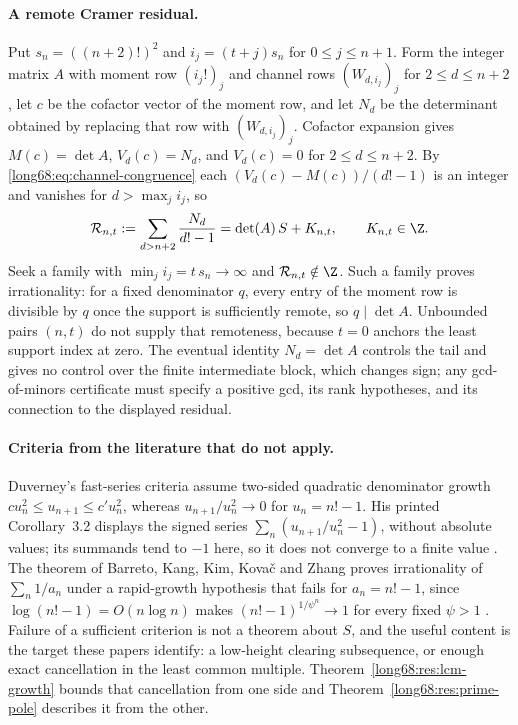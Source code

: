 \documentclass[11pt]{article}
\newcommand{\Ser}{S}
\newcommand{\chn}[2]{V_{#1}(#2)}
\begin{document}
\paragraph{A remote Cramer residual.}
Put $s_n=((n+2)!)^2$ and $i_j=(t+j)s_n$ for $0\le j\le n+1$.  Form the
integer matrix $A$ with moment row $(i_j!)_j$ and channel rows
$(W_{d,i_j})_j$ for $2\le d\le n+2$, let $c$ be the cofactor vector of the
moment row, and let $N_d$ be the determinant obtained by replacing that row
with $(W_{d,i_j})_j$.  Cofactor expansion gives $M(c)=\det A$,
$\chn dc=N_d$, and $\chn dc=0$ for $2\le d\le n+2$.  By
\eqref{long68:eq:channel-congruence} each $(\chn dc-M(c))/(d!-1)$ is an integer and
vanishes for $d>\max_ji_j$, so
\[
 \mathcal R_{n,t}:=\sum_{d>n+2}\frac{N_d}{d!-1}
 =\det(A)\,\Ser+K_{n,t},\qquad K_{n,t}\in\Z .
\]
Seek a family with $\min_ji_j=t\,s_n\to\infty$ and
$\mathcal R_{n,t}\notin\Z$.  Such a family proves irrationality: for a fixed
denominator $q$, every entry of the moment row is divisible by $q$ once the
support is sufficiently remote, so $q\mid\det A$.  Unbounded pairs $(n,t)$ do
not supply that remoteness, because $t=0$ anchors the least support index at
zero.  The eventual identity $N_d=\det A$ controls the tail and gives no
control over the finite intermediate block, which changes sign; any
gcd-of-minors certificate must specify a positive gcd, its rank hypotheses,
and its connection to the displayed residual.

\paragraph{Criteria from the literature that do not apply.}
Duverney's fast-series criteria assume two-sided quadratic denominator growth
$cu_n^2\le u_{n+1}\le c'u_n^2$, whereas $u_{n+1}/u_n^2\to0$ for
$u_n=n!-1$.  His printed Corollary~3.2 displays the signed series
$\sum_n(u_{n+1}/u_n^2-1)$, without absolute values; its summands tend to
$-1$ here, so it does not converge to a finite value
\cite[pp.~275, 285--287]{duverney}.  The theorem of Barreto, Kang, Kim,
Kova\v{c} and Zhang proves irrationality of $\sum_n1/a_n$ under a
rapid-growth hypothesis that fails for $a_n=n!-1$, since
$\log(n!-1)=O(n\log n)$ makes $(n!-1)^{1/\psi^n}\to1$ for every fixed
$\psi>1$ \cite[Thms.~2--3 and Rem.~4]{barreto-et-al}.  Failure of a
sufficient criterion is not a theorem about $\Ser$, and the useful content is
the target these papers identify: a low-height clearing subsequence, or
enough exact cancellation in the least common multiple.
Theorem~\ref{long68:res:lcm-growth} bounds that cancellation from one side and
Theorem~\ref{long68:res:prime-pole} describes it from the other.
\end{document}
